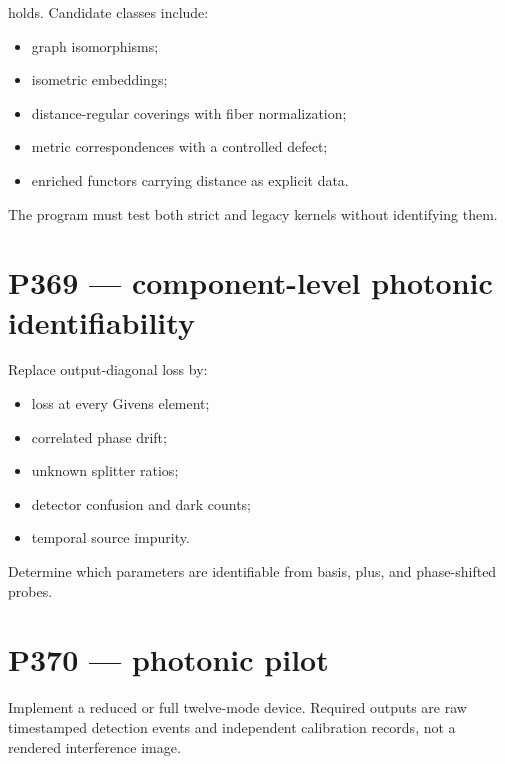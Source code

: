\documentclass[11pt,a4paper,openany]{report}
\begin{document}
holds. Candidate classes include:

\begin{itemize}
\item 
graph isomorphisms;

\item 
isometric embeddings;

\item 
distance-regular coverings with fiber normalization;

\item 
metric correspondences with a controlled defect;

\item 
enriched functors carrying distance as explicit data.

\end{itemize}

The program must test both strict and legacy kernels without identifying them.

\section{P369 --- component-level photonic identifiability}

Replace output-diagonal loss by:

\begin{itemize}
\item 
loss at every Givens element;

\item 
correlated phase drift;

\item 
unknown splitter ratios;

\item 
detector confusion and dark counts;

\item 
temporal source impurity.

\end{itemize}

Determine which parameters are identifiable from basis, plus, and phase-shifted probes.

\section{P370 --- photonic pilot}

Implement a reduced or full twelve-mode device. Required outputs are raw timestamped detection events and independent calibration records, not a rendered interference image.
\end{document}
